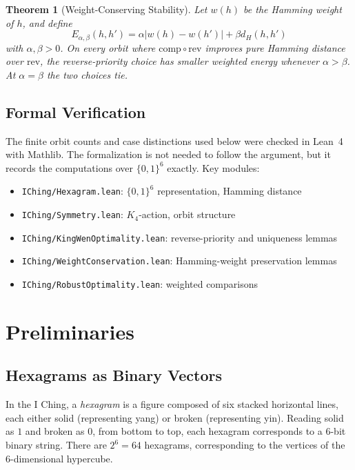 \documentclass[11pt]{article}
\theoremstyle{definition}
\theoremstyle{plain}
\newtheorem{theorem}[definition]{Theorem}
\newcommand{\B}{\{0,1\}}
\newcommand{\Ham}{d_H}
\newcommand{\comp}{\mathrm{comp}}
\newcommand{\rev}{\mathrm{rev}}
\begin{document}
\begin{theorem}[Weight-Conserving Stability]\label{thm:weightedintro}
Let $w(h)$ be the Hamming weight of $h$, and define
\[
E_{\alpha,\beta}(h,h')=\alpha |w(h)-w(h')|+\beta \Ham(h,h')
\]
with $\alpha,\beta>0$. On every orbit where $\comp\circ\rev$ improves pure Hamming distance over $\rev$, the reverse-priority choice has smaller weighted energy whenever $\alpha>\beta$. At $\alpha=\beta$ the two choices tie.
\end{theorem}

\subsection{Formal Verification}

The finite orbit counts and case distinctions used below were checked in Lean~4 with Mathlib. The formalization is not needed to follow the argument, but it records the computations over $\B^6$ exactly. Key modules:
\begin{itemize}
    \item \texttt{IChing/Hexagram.lean}: $\B^6$ representation, Hamming distance
    \item \texttt{IChing/Symmetry.lean}: $K_4$-action, orbit structure
    \item \texttt{IChing/KingWenOptimality.lean}: reverse-priority and uniqueness lemmas
    \item \texttt{IChing/WeightConservation.lean}: Hamming-weight preservation lemmas
    \item \texttt{IChing/RobustOptimality.lean}: weighted comparisons
\end{itemize}

\section{Preliminaries}

\subsection{Hexagrams as Binary Vectors}

In the I Ching, a \emph{hexagram} is a figure composed of six stacked horizontal lines, each either solid (representing yang) or broken (representing yin). Reading solid as $1$ and broken as $0$, from bottom to top, each hexagram corresponds to a 6-bit binary string. There are $2^6 = 64$ hexagrams, corresponding to the vertices of the 6-dimensional hypercube.
\end{document}
